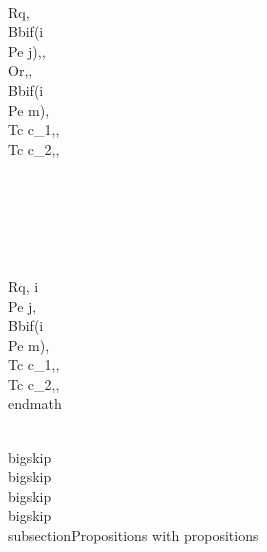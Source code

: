 \\Rq, \\Bb{if(i \\Pe j)}{,}{, \\Or,}, \\Bb{if(i \\Pe m)}{,\\Tc c_1,}{,\\Tc c_2,},\\\\\\\\\\\\
\\Rq, i \\Pe j, \\Bb{if(i \\Pe m)}{,\\Tc c_1,}{,\\Tc c_2,},
\\end{math}



\\bigskip
\\bigskip
\\bigskip
\\bigskip
\\subsection{Propositions with propositions}
\\[,i \\Pe j, j \\Pe m, \\Rq , i \\Pe j, i \\Pe m,\\]

